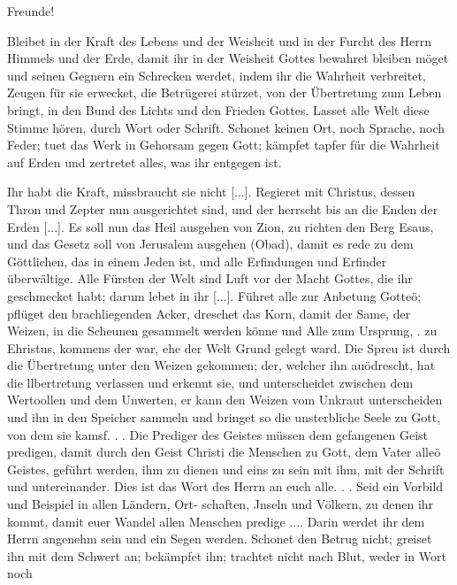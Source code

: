 {
    Freunde!

    \bigskip

    Bleibet in der Kraft des Lebens und der Weisheit und in
    der Furcht des Herrn Himmels und der Erde, damit ihr in der
    Weisheit Gottes bewahret bleiben möget und seinen Gegnern ein
    Schrecken werdet, indem ihr die Wahrheit verbreitet, Zeugen für
    sie erwecket, die Betrügerei stürzet, von der Übertretung zum
    Leben bringt, in den Bund des Lichts und den Frieden Gottes.
    Lasset alle Welt diese Stimme hören, durch Wort oder Schrift.
    Schonet keinen Ort, noch Sprache, noch Feder; tuet das Werk
    in Gehorsam gegen Gott; kämpfet tapfer für die Wahrheit auf
    Erden und zertretet alles, was ihr entgegen ist. 

    Ihr habt die
    Kraft, missbraucht sie nicht [...]. Regieret mit Christus, dessen
    Thron und Zepter nun ausgerichtet sind, und der herrscht bis an
    die Enden der Erden [...]. Es soll nun das Heil ausgehen
    von Zion, zu richten den Berg Esaus, und das Gesetz soll von 
    Jerusalem ausgehen (Obad), damit es rede zu dem Göttlichen, 
    das in einem
    Jeden ist, und alle Erfindungen und Erfinder überwältige. Alle
    Fürsten der Welt sind Luft vor der Macht Gottes, die ihr 
    geschmecket habt; darum lebet in ihr [...].
    Führet alle zur Anbetung Gotteö; pflüget den brachliegenden
    Acker, dreschet das Korn, damit der Same, der Weizen, in die
    Scheunen gesammelt werden könne und Alle zum Ursprung,
    . zu Ehristus, kommens der war, ehe der Welt Grund gelegt ward.
    Die Spreu ist durch die Übertretung unter den Weizen gekommen;
    der, welcher ihn auödrescht, hat die llbertretung verlassen und
    erkennt sie, und unterscheidet zwischen dem Wertoollen und dem
    Unwerten, er kann den Weizen vom Unkraut unterscheiden und
    ihn in den Speicher sammeln und bringet so die unsterbliche
    Seele zu Gott, von dem sie kamsf. . . Die Prediger des Geistes
    müssen dem gefangenen Geist predigen, damit durch den Geist
    Christi die Menschen zu Gott, dem Vater alleö Geistes, geführt
    werden, ihm zu dienen und eins zu sein mit ihm, mit der Schrift
    und untereinander. Dies ist das Wort des Herrn an euch alle.
    . .   Seid ein Vorbild und Beispiel in allen Ländern, Ort-
    schaften, Jnseln und Völkern, zu denen ihr kommt, damit euer
    Wandel allen Menschen predige .... Darin werdet ihr dem
    Herrn angenehm sein und ein Segen werden.
    Schonet den Betrug nicht; greiset ihn mit dem Schwert an;
    bekämpfet ihn; trachtet nicht nach Blut, weder in Wort noch


}
